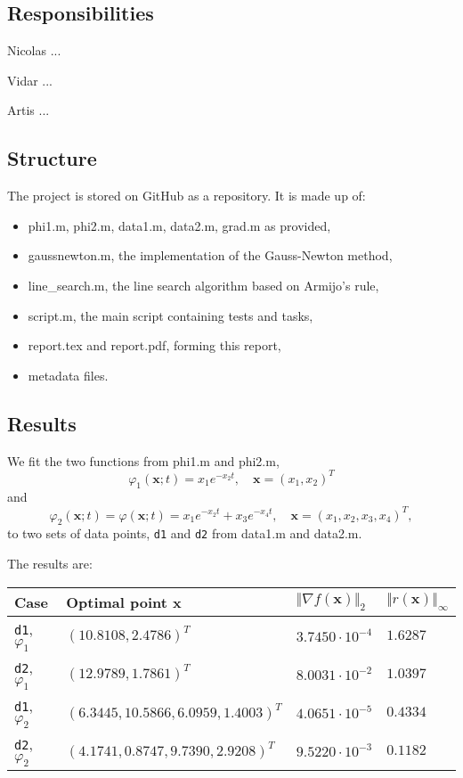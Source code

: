 \documentclass[12pt, a4paper]{article}
\newcommand{\bx}{{\boldsymbol{x}}}
\begin{document}
\subsection{Responsibilities}

Nicolas ...

Vidar ...

Artis ...

\subsection{Structure}

The project is stored on GitHub as a repository. It is made up of:\begin{itemize}
    \item phi1.m, phi2.m, data1.m, data2.m, grad.m as provided,
    \item gaussnewton.m, the implementation of the Gauss-Newton method,
    \item line\_search.m, the line search algorithm based on Armijo's rule,
    \item script.m, the main script containing tests and tasks,
    \item report.tex and report.pdf, forming this report,
    \item metadata files.
\end{itemize}

\subsection{Results}

We fit the two functions from phi1.m and phi2.m, \[\varphi_1(\bx;t)=x_1e^{-x_2t},\quad\bx={(x_1,x_2)}^T\] and \[\varphi_2(\bx;t)=\varphi(\bx; t)=x_1e^{-x_2t}+x_3e^{-x_4t},\quad\bx={(x_1,x_2,x_3,x_4)}^T,\] to two sets of data points, \texttt{d1} and \texttt{d2} from data1.m and data2.m.

The results are:
\begin{center}\bgroup{}
\begin{tabular}{|l|l|l|l|}
    \hline
    Case & Optimal point $\bx$ & $\Vert \nabla f(\bx) \Vert_2$ & $\Vert r(\bx) \Vert_{\infty}$
    \\ \hline
    \texttt{d1}, $\varphi_1$ & ${(10.8108, 2.4786)}^T$ & $3.7450\cdot10^{-4}$ & $1.6287$
    \\ \hline
    \texttt{d2}, $\varphi_1$ & ${(12.9789, 1.7861)}^T$ & $8.0031\cdot10^{-2}$ & $1.0397$
    \\ \hline
    \texttt{d1}, $\varphi_2$ & ${(6.3445, 10.5866, 6.0959, 1.4003)}^T$ & $4.0651\cdot10^{-5}$ & $0.4334$
    \\ \hline
    \texttt{d2}, $\varphi_2$ & ${(4.1741, 0.8747, 9.7390, 2.9208)}^T$ & $9.5220\cdot10^{-3}$ & $0.1182$
    \\ \hline
\end{tabular}
\egroup\end{center}
\end{document}
